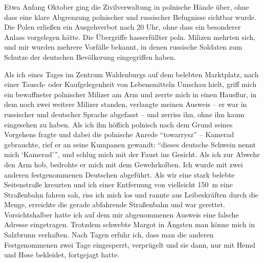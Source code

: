  Etwa Anfang Oktober ging die Zivilverwaltung in polnische Hände über, ohne dass eine klare Abgrenzung polnischer und russischer Befugnisse sichtbar wurde. Die Polen erließen ein Ausgehverbot nach 20 Uhr, ohne dass ein besonderer Anlass vorgelegen hätte. Die Übergriffe hasserfüllter poln. Milizen mehrten sich, und mir wurden mehrere Vorfälle bekannt, in denen russische Soldaten zum Schutze der deutschen Bevölkerung eingegriffen haben.

Als ich eines Tages im Zentrum Waldenburgs auf dem belebten Marktplatz, nach einer Tausch- oder Kaufgelegenheit von Lebensmitteln Umschau hielt, griff mich ein bewaffneter polnischer Milizer am Arm und zerrte mich in einen Hausflur, in dem noch zwei weitere Milizer standen, verlangte meinen Ausweis -- er war in russischer und deutscher Sprache abgefasst -- und zerriss ihn, ohne ihn kaum eingesehen zu haben. Als ich ihn höflich polnisch nach dem Grund seines Vorgehens fragte und dabei die polnische Anrede \enquote{towarrysz} -- Kamerad gebrauchte, rief er an seine Kumpanen gewandt: \enquote{dieses deutsche Schwein nennt mich \enquote{Kamerad}}, und schlug mich mit der Faust ins Gesicht. Als ich zur Abwehr den Arm hob, bedrohte er mich mit dem Gewehrkolben. Ich wurde mit zwei anderen festgenommenen Deutschen abgeführt. Als wir eine stark belebte Seitenstraße kreuzten und ich einer Entfernung von vielleicht 150~m eine Straßenbahn fahren  sah, riss ich mich los und rannte aus Leibeskräften durch die Menge, erreichte die gerade abfahrende Straßenbahn und war gerettet. Vorsichtshalber hatte ich auf dem mir abgenommenen Ausweis eine falsche Adresse eingetragen. Trotzdem schwebte Margot in Ängsten man könne mich in Salzbrunn verhaften. Nach Tagen erfuhr ich, dass man die anderen Festgenommenen zwei Tage eingesperrt, verprügelt und sie dann, nur mit Hemd und Hose bekleidet, fortgejagt hatte.

